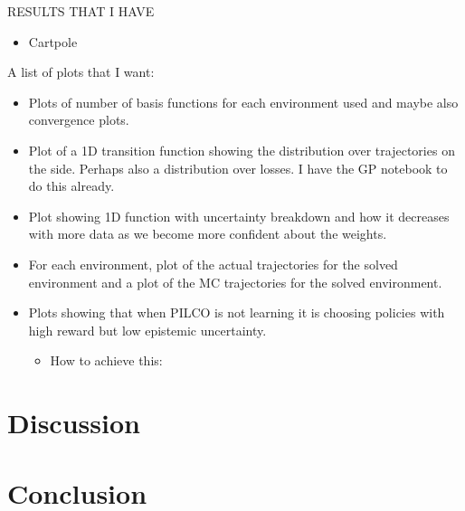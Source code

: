 RESULTS THAT I HAVE
\begin{itemize}
    \item Cartpole
\end{itemize}

A list of plots that I want:

\begin{itemize}
    \item Plots of number of basis functions for each environment used and maybe also convergence plots.
    \item Plot of a 1D transition function showing the distribution over trajectories on the side. Perhaps also a distribution over losses. I have the GP notebook to do this already.
    \item Plot showing 1D function with uncertainty breakdown and how it decreases with more data as we become more confident about the weights.
    \item For each environment, plot of the actual trajectories for the solved environment and a plot of the MC trajectories for the solved environment.
    \item Plots showing that when PILCO is not learning it is choosing policies with high reward but low epistemic uncertainty.
    \begin{itemize}
        \item How to achieve this: 
    \end{itemize}    
\end{itemize}

\section{Discussion}

\section{Conclusion}



